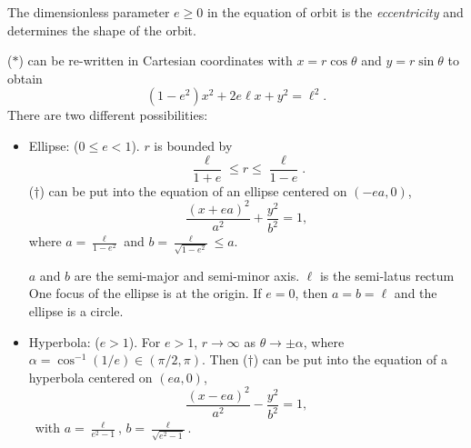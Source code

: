 \documentclass[a4paper]{article}
\begin{document}
\begin{defi}[Eccentricity]
  The dimensionless parameter $e \geq 0$ in the equation of orbit is the \emph{eccentricity} and determines the shape of the orbit.
\end{defi}

($*$) can be re-written in Cartesian coordinates with $x = r\cos \theta$ and $y = r\sin \theta$ to obtain
\[
  (1 - e^2)x^2 + 2e\ell x + y^2 = \ell^2.\tag{$\dagger$}
\]
There are two different possibilities:
\begin{itemize}
  \item Ellipse: ($0\leq e < 1$). $r$ is bounded by
    \[
      \frac{\ell}{1 + e} \leq r \leq \frac{\ell}{1 - e}.
    \]
    ($\dagger$) can be put into the equation of an ellipse centered on $(-ea, 0)$,
    \[
      \frac{(x + ea)^2}{a^2} + \frac{y^2}{b^2} = 1,
    \]
    where $\displaystyle a = \frac{\ell}{1 - e^2}$ and $\displaystyle b = \frac{\ell}{\sqrt{1 - e^2}}\leq a$.
    \begin{center}
    \end{center}

    $a$ and $b$ are the semi-major and semi-minor axis. $\ell$ is the semi-latus rectum 
    One focus of the ellipse is at the origin. If $e = 0$, then $a = b = \ell$ and the ellipse is a circle.

  \item Hyperbola: ($e > 1$). For $e > 1$, $r\to \infty$ as $\theta \to \pm \alpha$, where $\alpha = \cos^{-1}(1/e)\in (\pi/2, \pi)$. Then ($\dagger$) can be put into the equation of a hyperbola centered on $(ea, 0)$,
    \[
      \frac{(x - ea)^2}{a^2} - \frac{y^2}{b^2} = 1,
    \]\
    with $\displaystyle a = \frac{\ell}{e^2 - 1}$, $\displaystyle b = \frac{\ell}{\sqrt{e^2 - 1}}$.


\end{itemize}
\end{document}
